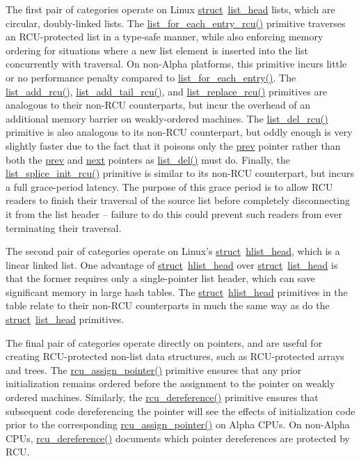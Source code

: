 The first pair of categories operate on Linux
\url{struct}~\url{list_head} lists, which are circular, doubly-linked
lists.
The \url{list_for_each_entry_rcu()} primitive traverses an
RCU-protected list in a type-safe manner, while also enforcing
memory ordering for situations where a new list element is inserted
into the list concurrently with traversal.
On non-Alpha platforms, this primitive incurs little or no performance
penalty compared to \url{list_for_each_entry()}.
The \url{list_add_rcu()}, \url{list_add_tail_rcu()},
and \url{list_replace_rcu()} primitives are analogous to
their non-RCU counterparts, but incur the overhead of an additional
memory barrier on weakly-ordered machines.
The \url{list_del_rcu()} primitive is also analogous to its
non-RCU counterpart, but oddly enough is very slightly faster due to the
fact that it poisons only the \url{prev} pointer rather than
both the \url{prev} and \url{next} pointers as
\url{list_del()} must do.
Finally, the \url{list_splice_init_rcu()} primitive is similar
to its non-RCU counterpart, but incurs a full grace-period latency.
The purpose of this grace period is to allow RCU readers to finish
their traversal of the source list before completely disconnecting
it from the list header -- failure to do this could prevent such
readers from ever terminating their traversal.

 \QuickQuizEnd

The second pair of categories operate on Linux's
\url{struct}~\url{hlist_head}, which is a linear linked list.
One advantage of \url{struct}~\url{hlist_head} over
\url{struct}~\url{list_head} is that the former requires only
a single-pointer list header, which can save significant memory in
large hash tables.
The \url{struct}~\url{hlist_head} primitives in the table
relate to their non-RCU counterparts in much the same way as do the
\url{struct}~\url{list_head} primitives.

The final pair of categories operate directly on pointers, and
are useful for creating RCU-protected non-list data structures,
such as RCU-protected arrays and trees.
The \url{rcu_assign_pointer()} primitive ensures that any
prior initialization remains ordered before the assignment to the
pointer on weakly ordered machines.
Similarly, the \url{rcu_dereference()} primitive ensures that subsequent
code dereferencing the pointer will see the effects of initialization code
prior to the corresponding \url{rcu_assign_pointer()} on
Alpha CPUs.
On non-Alpha CPUs, \url{rcu_dereference()} documents which pointer
dereferences are protected by RCU.

